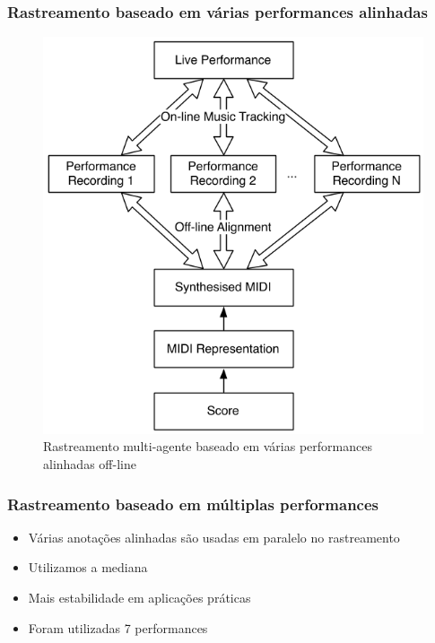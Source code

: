 \begin{frame}[label=figura2]
  \frametitle{Rastreamento baseado em várias performances alinhadas}
  \begin{figure}[!ht]
    \centering
    \includegraphics[height=0.7\textheight]{src/img/2-Figure2-1.png}
    \caption*{Rastreamento multi-agente baseado em várias performances alinhadas off-line}
  \end{figure}
\end{frame}

\begin{frame}
  \frametitle{Rastreamento baseado em múltiplas performances}
  \begin{itemize}
    \item Várias anotações alinhadas são usadas em paralelo no rastreamento\pause
    \item Utilizamos a mediana \pause %
    \item Mais estabilidade em aplicações práticas \pause
    \item Foram utilizadas 7 performances\pause 
  \end{itemize}
\end{frame}
